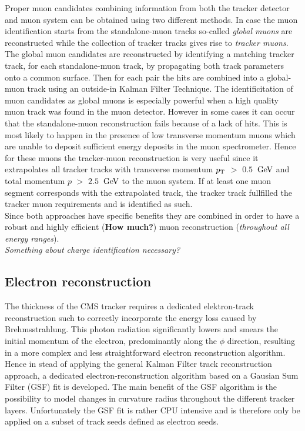 Proper muon candidates combining information from both the tracker detector and muon system can be obtained using two different methods. In case the muon identification starts from the standalone-muon tracks so-called \textit{global muons} are reconstructed while the collection of tracker tracks gives rise to \textit{tracker muons}.
The global muon candidates are reconstructed by identifying a matching tracker track, for each standalone-muon track, by propagating both track parameters onto a common surface. Then for each pair the hits are combined into a global-muon track using an outside-in Kalman Filter Technique. The identificitation of muon candidates as global muons is especially powerful when a high quality muon track was found in the muon detector. However in some cases it can occur that the standalone-muon reconstruction fails because of a lack of hits. This is most likely to happen in the presence of low transverse momentum muons which are unable to deposit sufficient energy deposits in the muon spectrometer. Hence for these muons the tracker-muon reconstruction is very useful since it extrapolates all tracker tracks with transverse momentum $p_{\rm T}$ $>$ $0.5$ $\, \mathrm{GeV}$ and total momentum $p$ $>$ $2.5$ $\, \mathrm{GeV}$ to the muon system. If at least one muon segment corresponds with the extrapolated track, the tracker track fullfilled the tracker muon requirements and is identified as such.
\\
Since both approaches have specific benefits they are combined in order to have a robust and highly efficient (\textbf{How much?}) muon reconstruction (\textit{throughout all energy ranges}).
\\
\textit{Something about charge identification necessary?}
 
\subsection{Electron reconstruction} \label{subsec::Electron}

The thickness of the CMS tracker requires a dedicated elektron-track reconstruction such to correctly incorporate the energy loss caused by Brehmsstrahlung. 
This photon radiation significantly lowers and smears the initial momentum of the electron, predominantly along the $\phi$ direction, resulting in a more complex and less straightforward electron reconstruction algorithm.
Hence in stead of applying the general Kalman Filter track reconstruction approach, a dedicated electron-reconstruction algorithm based on a Gausian Sum Filter (GSF) fit is developed. The main benefit of the GSF algorithm is the possibility to model changes in curvature radius throughout the different tracker layers. 
Unfortunately the GSF fit is rather CPU intensive and is therefore only be applied on a subset of track seeds defined as electron seeds.

